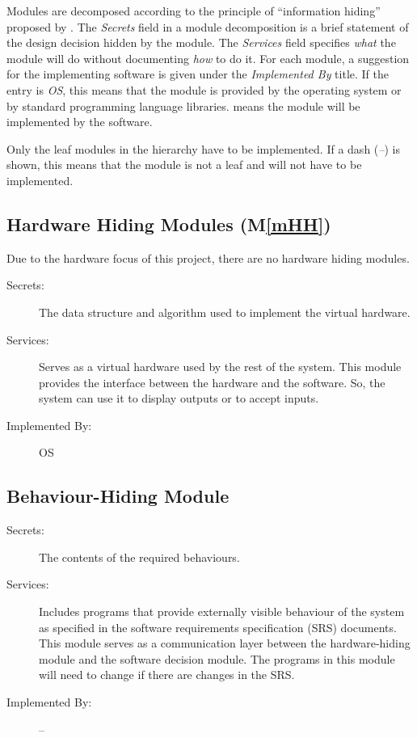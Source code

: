 \documentclass[12pt, titlepage]{article}
\newcommand{\mref}[1]{M\ref{#1}}
\begin{document}
Modules are decomposed according to the principle of ``information hiding''
proposed by \citet{ParnasEtAl1984}. The \emph{Secrets} field in a module
decomposition is a brief statement of the design decision hidden by the
module. The \emph{Services} field specifies \emph{what} the module will do
without documenting \emph{how} to do it. For each module, a suggestion for the
implementing software is given under the \emph{Implemented By} title. If the
entry is \emph{OS}, this means that the module is provided by the operating
system or by standard programming language libraries.  \emph{\progname{}} means the
module will be implemented by the \progname{} software.

Only the leaf modules in the hierarchy have to be implemented. If a dash
(\emph{--}) is shown, this means that the module is not a leaf and will not have
to be implemented.

\subsection{Hardware Hiding Modules (\mref{mHH})}
Due to the hardware focus of this project, there are no hardware hiding modules.
\begin{description}
\item[Secrets:]The data structure and algorithm used to implement the virtual
  hardware.
\item[Services:]Serves as a virtual hardware used by the rest of the
  system. This module provides the interface between the hardware and the
  software. So, the system can use it to display outputs or to accept inputs.
\item[Implemented By:] OS
\end{description}

\subsection{Behaviour-Hiding Module}

\begin{description}
\item[Secrets:]The contents of the required behaviours.
\item[Services:]Includes programs that provide externally visible behaviour of
  the system as specified in the software requirements specification (SRS)
  documents. This module serves as a communication layer between the
  hardware-hiding module and the software decision module. The programs in this
  module will need to change if there are changes in the SRS.
\item[Implemented By:] --
\end{description}
\end{document}
